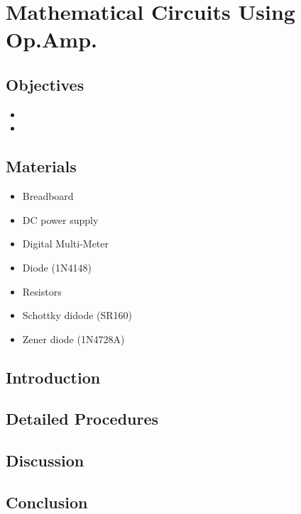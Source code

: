 \chapter{Mathematical Circuits Using Op.Amp.}


\section{Objectives}
\begin{itemize}
    \item 
    \item 
\end{itemize}

\section{Materials}
\begin{itemize}
    \item Breadboard
    \item DC power supply
    \item Digital Multi-Meter
    \item Diode (1N4148)
    \item Resistors
    \item Schottky didode (SR160)
    \item Zener diode (1N4728A)
\end{itemize}

\section{Introduction}


\section{Detailed Procedures}


\section{Discussion}


\section{Conclusion}

